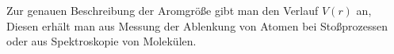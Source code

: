 Zur genauen Beschreibung der Aromgröße gibt man den Verlauf $V(r)$ an, Diesen
erhält man aus Messung der Ablenkung von Atomen bei Stoßprozessen oder aus
Spektroskopie von Molekülen.



